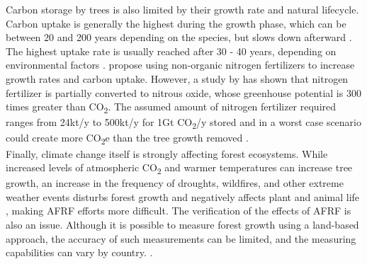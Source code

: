 Carbon storage by trees is also limited by their growth rate and natural lifecycle. Carbon uptake is generally the highest during the growth phase, which can be between 20 and 200 years depending on the species, but slows down afterward \parencite{Watson2000LandForestry}. The highest uptake rate is usually reached after 30 - 40 years, depending on environmental factors \parencite{NRC2015ClimateSequestration}. \textcite{Watson2000LandForestry} propose using non-organic nitrogen fertilizers to increase growth rates and carbon uptake. However, a study by \textcite{Crutzen2008AtmosphericPhysics} has shown that nitrogen fertilizer is partially converted to nitrous oxide, whose greenhouse potential is 300 times greater than CO\textsubscript{2}. The assumed amount of nitrogen fertilizer required ranges from 24kt/y \parencite{Rau2013DirectProduction} to 500kt/y \parencite{Dipple2021TheSystems} for 1Gt CO\textsubscript{2}/y stored and in a worst case scenario could create more CO\textsubscript{2}e than the tree growth removed \parencite{NRC2015ClimateSequestration}.\\Finally, climate change itself is strongly affecting forest ecosystems. While increased levels of atmospheric CO\textsubscript{2} and warmer temperatures can increase tree growth, an increase in the frequency of droughts, wildfires, and other extreme weather events disturbs forest growth and negatively affects plant and animal life \parencite{EPA2015ClimateForests}, making AFRF efforts more difficult.
The verification of the effects of AFRF is also an issue. Although it is possible to measure forest growth using a land-based approach, the accuracy of such measurements can be limited, and the measuring capabilities can vary by country. \parencite{Watson2000LandForestry}.
